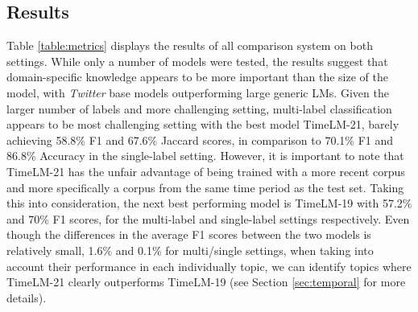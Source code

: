 \subsection{Results}
Table \ref{table:metrics} displays the results of all comparison system on both settings. While only a number of models were tested, the results suggest that domain-specific knowledge appears to be more important than the size of the model, with \textit{Twitter} base models outperforming large generic \acp{LM}. Given the larger number of labels and more challenging setting, multi-label classification appears to be most challenging setting with the best model TimeLM-21, barely achieving 58.8\% F1 and 67.6\% Jaccard scores, in comparison to 70.1\% F1 and 86.8\% Accuracy in the single-label setting. However, it is important to note that TimeLM-21 has the unfair advantage of being trained with a more recent corpus and more specifically a corpus from the same time period as the test set. Taking this into consideration, the next best performing model is TimeLM-19 with 57.2\% and 70\% F1 scores, for the multi-label and single-label settings respectively. Even though the differences in the average F1 scores between the two models is relatively small, 1.6\% and 0.1\% for multi/single settings, when taking into account their performance in each individually topic, we can identify topics where TimeLM-21 clearly outperforms TimeLM-19 (see Section \ref{sec:temporal} for more details).


